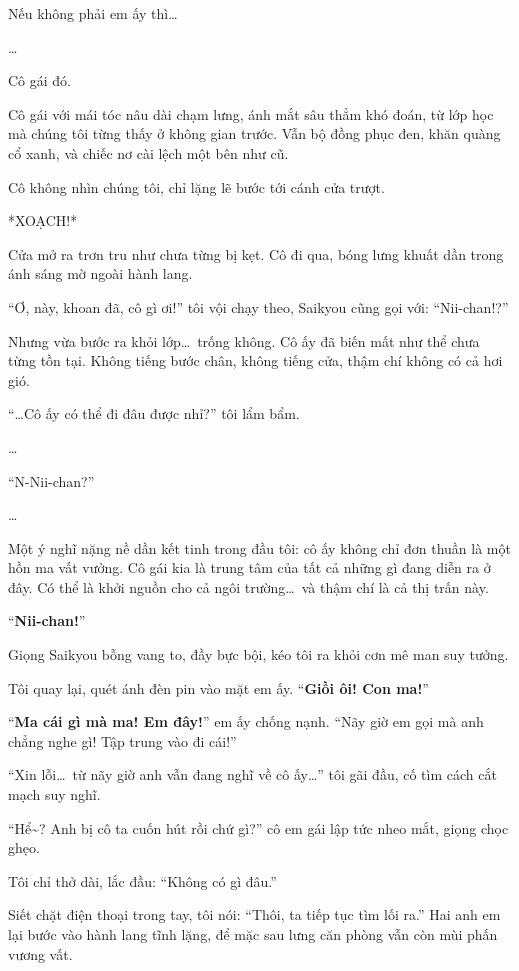 \documentclass[../main.tex]{subfiles}
\begin{document}
Nếu không phải em ấy thì\dots

\dots


Cô gái đó.

Cô gái với mái tóc nâu dài chạm lưng, ánh mắt sâu thẳm khó đoán, từ lớp học mà chúng tôi từng thấy ở không gian trước. Vẫn bộ đồng phục đen, khăn quàng cổ xanh, và chiếc nơ cài lệch một bên như cũ.

Cô không nhìn chúng tôi, chỉ lặng lẽ bước tới cánh cửa trượt.

*XOẠCH!*

Cửa mở ra trơn tru như chưa từng bị kẹt. Cô đi qua, bóng lưng khuất dần trong ánh sáng mờ ngoài hành lang.

``Ơ, này, khoan đã, cô gì ơi!'' tôi vội chạy theo, Saikyou cũng gọi với: ``Nii-chan!?''

Nhưng vừa bước ra khỏi lớp\dots\ trống không. Cô ấy đã biến mất như thể chưa từng tồn tại. Không tiếng bước chân, không tiếng cửa, thậm chí không có cả hơi gió.

``\dots Cô ấy có thể đi đâu được nhỉ?'' tôi lẩm bẩm.

\dots

``N-Nii-chan?''

\dots

Một ý nghĩ nặng nề dần kết tinh trong đầu tôi: cô ấy không chỉ đơn thuần là một hồn ma vất vưởng. Cô gái kia là trung tâm của tất cả những gì đang diễn ra ở đây. Có thể là khởi nguồn cho cả ngôi trường\dots\ và thậm chí là cả thị trấn này.

``\textbf{Nii-chan!}''

Giọng Saikyou bỗng vang to, đầy bực bội, kéo tôi ra khỏi cơn mê man suy tưởng.

Tôi quay lại, quét ánh đèn pin vào mặt em ấy. ``\textbf{Giồi ôi! Con ma!}''

``\textbf{Ma cái gì mà ma! Em đây!}'' em ấy chống nạnh. ``Nãy giờ em gọi mà anh chẳng nghe gì! Tập trung vào đi cái!''

``Xin lỗi\dots\ từ nãy giờ anh vẫn đang nghĩ về cô ấy\dots'' tôi gãi đầu, cố tìm cách cắt mạch suy nghĩ.

``Hể\~{}? Anh bị cô ta cuốn hút rồi chứ gì?'' cô em gái lập tức nheo mắt, giọng chọc ghẹo.

Tôi chỉ thở dài, lắc đầu: ``Không có gì đâu.''

Siết chặt điện thoại trong tay, tôi nói: ``Thôi, ta tiếp tục tìm lối ra.'' Hai anh em lại bước vào hành lang tĩnh lặng, để mặc sau lưng căn phòng vẫn còn mùi phấn vương vất.
\end{document}
